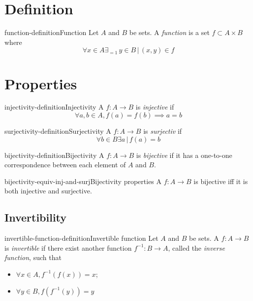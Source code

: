 \documentclass[preview]{standalone}
\begin{document}
\genpage

\section{Definition}

\begin{snippetdefinition}{function-definition}{Function}
    Let \(A\) and \(B\) be sets.
    A \textit{function} is a set \(f \subset A \times B\) where
    \[
        \forall x \in A \exists_{=1} \, y \in B \,|\, (x,y) \in f
    \]
\end{snippetdefinition}

\section{Properties}

\begin{snippetdefinition}{injectivity-definition}{Injectivity}
    A \function \(f:A\to B\) is \textit{injective} if
    \[
        \forall a,b \in A, f(a) = f(b) \implies a = b
    \]
\end{snippetdefinition}

\begin{snippetdefinition}{surjectivity-definition}{Surjectivity}
    A \function \(f:A\to B\) is \textit{surjectiv} if
    \[
        \forall b \in B \exists a \,|\, f(a)=b
    \]
\end{snippetdefinition}

\begin{snippetdefinition}{bijectivity-definition}{Bijectivity}
    A \function \(f:A\to B\) is \textit{bijective} if
    it has a one-to-one correspondence between each element of \(A\) and  \(B\).
\end{snippetdefinition}

\begin{snippetcorollary}{bijectivity-equiv-inj-and-surj}{Bijectivity properties}
    A \function \(f:A\to B\) is bijective iff it is both injective and surjective.
\end{snippetcorollary}

\subsection{Invertibility}

\begin{snippetdefinition}{invertible-function-definition}{Invertible function}
    Let \(A\) and \(B\) be sets. A \function \(f\colon A \to B\) is \textit{invertible}
    if there exist another function \(f^{-1}\colon B \to A\), called the \textit{inverse function},
    such that
    \begin{itemize}
        \item \(\forall x \in A, f^{-1}(f(x)) = x\);
        \item \(\forall y \in B, f(f^{-1}(y)) = y\)
    \end{itemize}
\end{snippetdefinition}
\end{document}
